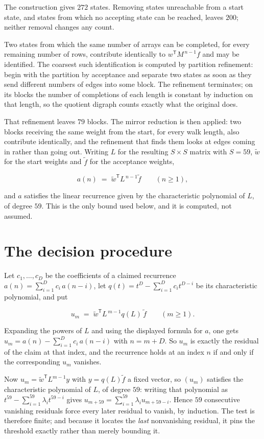 \documentclass[11pt]{article}
\theoremstyle{definition}
\begin{document}
The construction gives $272$ states. Removing states unreachable from a start state, and states from which no accepting state can be reached, leaves $200$; neither removal changes any count.

Two states from which the same number of arrays can be completed, for every remaining number of rows, contribute identically to $w^{\mathsf T}M^{\,n-1}f$ and may be identified. The coarsest such identification is computed by partition refinement: begin with the partition by acceptance and separate two states as soon as they send different numbers of edges into some block. The refinement terminates; on its blocks the number of completions of each length is constant by induction on that length, so the quotient digraph counts exactly what the original does.

That refinement leaves $79$ blocks. The mirror reduction is then applied: two blocks receiving the same weight from the start, for every walk length, also contribute identically, and the refinement that finds them looks at edges coming in rather than going out. Writing $L$ for the resulting $S \times S$ matrix with $S = 59$, $\tilde w$ for the start weights and $\tilde f$ for the acceptance weights,

\[a(n) \;=\; \tilde w^{\mathsf T} L^{\,n-1} \tilde f \qquad (n \ge 1),\]

and $a$ satisfies the linear recurrence given by the characteristic polynomial of $L$, of degree $59$. This is the only bound used below, and it is computed, not assumed.

\section{The decision procedure}

Let $c_1,\dots,c_D$ be the coefficients of a claimed recurrence $a(n) = \sum_{i=1}^{D} c_i\,a(n-i)$, let $q(t) = t^{D} - \sum_{i=1}^{D} c_i t^{D-i}$ be its characteristic polynomial, and put

\[u_m \;=\; \tilde w^{\mathsf T} L^{\,m-1} q(L)\,\tilde f \qquad (m \ge 1).\]

Expanding the powers of $L$ and using the displayed formula for $a$, one gets $u_m = a(n) - \sum_{i=1}^{D} c_i\,a(n-i)$ with $n = m + D$. So $u_m$ is exactly the residual of the claim at that index, and the recurrence holds at an index $n$ if and only if the corresponding $u_m$ vanishes.

Now $u_m = \tilde w^{\mathsf T} L^{m-1} y$ with $y = q(L)\tilde f$ a fixed vector, so $(u_m)$ satisfies the characteristic polynomial of $L$, of degree $59$: writing that polynomial as $t^{59} - \sum_{i=1}^{59} \lambda_i t^{59-i}$ gives $u_{m+59} = \sum_{i=1}^{59} \lambda_i u_{m+59-i}$. Hence $59$ consecutive vanishing residuals force every later residual to vanish, by induction. The test is therefore finite; and because it locates the {\itshape last} nonvanishing residual, it pins the threshold exactly rather than merely bounding it.
\end{document}
